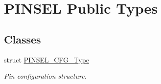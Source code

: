 \hypertarget{group___p_i_n_s_e_l___public___types}{\section{\-P\-I\-N\-S\-E\-L \-Public \-Types}
\label{group___p_i_n_s_e_l___public___types}
}
\subsection*{\-Classes}
\begin{DoxyCompactItemize}
\item 
struct \hyperlink{struct_p_i_n_s_e_l___c_f_g___type}{\-P\-I\-N\-S\-E\-L\-\_\-\-C\-F\-G\-\_\-\-Type}
\begin{DoxyCompactList}\small\item\em \-Pin configuration structure. \end{DoxyCompactList}\end{DoxyCompactItemize}
